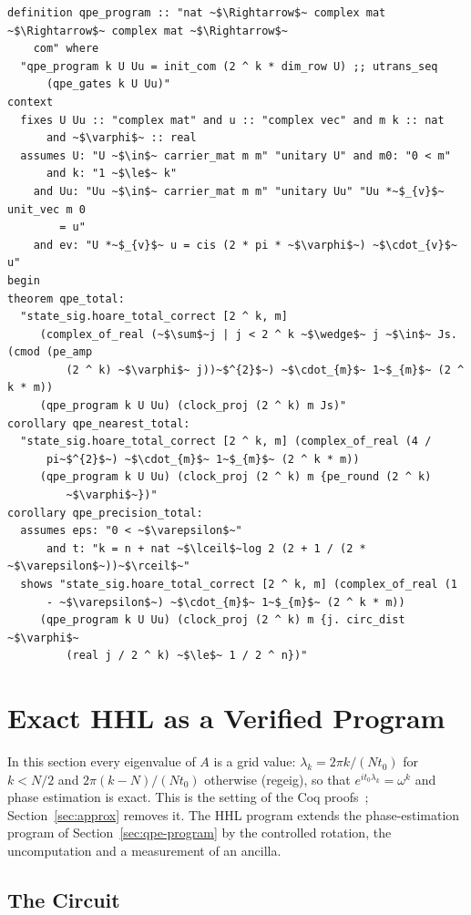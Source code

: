 \documentclass[runningheads]{llncs}
\DeclareRobustCommand{\isa}[1]{\textsf{\def\_{\char95\allowbreak}#1}}
\begin{document}
\begin{lstlisting}[float=tp, caption={Theorem~\ref{thm:qpe-prog} (\isa{Js} is the set $J$)},label={lst:qpeprog}]
definition qpe_program :: "nat ~$\Rightarrow$~ complex mat ~$\Rightarrow$~ complex mat ~$\Rightarrow$~
    com" where
  "qpe_program k U Uu = init_com (2 ^ k * dim_row U) ;; utrans_seq
      (qpe_gates k U Uu)"
context
  fixes U Uu :: "complex mat" and u :: "complex vec" and m k :: nat
      and ~$\varphi$~ :: real
  assumes U: "U ~$\in$~ carrier_mat m m" "unitary U" and m0: "0 < m"
      and k: "1 ~$\le$~ k"
    and Uu: "Uu ~$\in$~ carrier_mat m m" "unitary Uu" "Uu *~$_{v}$~ unit_vec m 0
        = u"
    and ev: "U *~$_{v}$~ u = cis (2 * pi * ~$\varphi$~) ~$\cdot_{v}$~ u"
begin
theorem qpe_total:
  "state_sig.hoare_total_correct [2 ^ k, m]
     (complex_of_real (~$\sum$~j | j < 2 ^ k ~$\wedge$~ j ~$\in$~ Js. (cmod (pe_amp
         (2 ^ k) ~$\varphi$~ j))~$^{2}$~) ~$\cdot_{m}$~ 1~$_{m}$~ (2 ^ k * m))
     (qpe_program k U Uu) (clock_proj (2 ^ k) m Js)"
corollary qpe_nearest_total:
  "state_sig.hoare_total_correct [2 ^ k, m] (complex_of_real (4 /
      pi~$^{2}$~) ~$\cdot_{m}$~ 1~$_{m}$~ (2 ^ k * m))
     (qpe_program k U Uu) (clock_proj (2 ^ k) m {pe_round (2 ^ k)
         ~$\varphi$~})"
corollary qpe_precision_total:
  assumes eps: "0 < ~$\varepsilon$~"
      and t: "k = n + nat ~$\lceil$~log 2 (2 + 1 / (2 * ~$\varepsilon$~))~$\rceil$~"
  shows "state_sig.hoare_total_correct [2 ^ k, m] (complex_of_real (1
      - ~$\varepsilon$~) ~$\cdot_{m}$~ 1~$_{m}$~ (2 ^ k * m))
     (qpe_program k U Uu) (clock_proj (2 ^ k) m {j. circ_dist ~$\varphi$~
         (real j / 2 ^ k) ~$\le$~ 1 / 2 ^ n})"
\end{lstlisting}

\section{Exact HHL as a Verified Program}\label{sec:exact}

In this section every eigenvalue of $A$ is a grid value: $\lambda_k=2\pi k/(Nt_0)$ for $k<N/2$ and
$2\pi(k-N)/(Nt_0)$ otherwise (\isa{reg\_eig}), so that $e^{it_0\lambda_k}=\omega^k$ and phase
estimation is exact. This is the setting of the Coq proofs~\cite{zhou2023coqq,wu2024local};
Section~\ref{sec:approx} removes it. The HHL program extends the phase-estimation program of
Section~\ref{sec:qpe-program} by the controlled rotation, the uncomputation and a measurement of an
ancilla.

\subsection{The Circuit}
\end{document}
